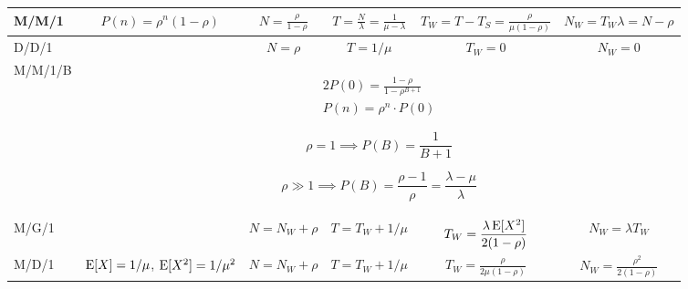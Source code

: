 \documentclass{form}
\begin{document}
\begin{center}
    \begin{tabular}{@{}l || c | c | c | c | c @{}}
        M/M/1   & $\displaystyle P(n) = \rho^n(1-\rho)$   & $\displaystyle N=\frac{\rho}{1-\rho}$ & $\displaystyle T=\frac{N}{\lambda} = \frac{1}{\mu-\lambda}$ & $\displaystyle T_W = T-T_S = \frac{\rho}{\mu(1-\rho)}$ & $\displaystyle N_W = T_W \lambda = N-\rho$ \\ \hline
        D/D/1   &                                         & $\displaystyle N=\rho$                & $\displaystyle T=1/\mu$                                     & $\displaystyle T_W = 0$                                & $\displaystyle N_W = 0$                    \\ \hline
        M/M/1/B & \multicolumn{5}{c}{
            \begin{minipage}{0.15\textwidth}
                \vspace{-0.8em}
                \begin{alignat*}{2}
                    P(0) = \frac{1-\rho}{1-\rho^{B+1}} \\
                    P(n) = \rho^n\cdot P(0)
                \end{alignat*}
            \end{minipage}
            \begin{minipage}{0.35\textwidth}
                \vspace{-0.8em}
                \begin{equation*}
                    \rho = 1 \implies P(B) = \frac{1}{B+1}
                \end{equation*}
            \end{minipage}
            \begin{minipage}{0.30\textwidth}
                \vspace{-0.8em}
                \begin{equation*}
                    \rho \gg 1 \implies P(B) = \frac{\rho-1}{\rho} = \frac{\lambda - \mu}{\lambda}
                \end{equation*}
            \end{minipage}
        } \\ \hline
        M/G/1   &                                         & $\displaystyle N=N_W + \rho$                & $\displaystyle T=T_W+1/\mu$                             & $\displaystyle T_W = \frac{\lambda \operatorname{E}[X^2]}{2(1-\rho)}$                    & $\displaystyle N_W = \lambda T_W$                 \\ \hline
        M/D/1   & $\operatorname{E}[X]=1/\mu$, $\operatorname{E}[X^2]=1/\mu^2$ & $\displaystyle N=N_W + \rho$                & $\displaystyle T=T_W+1/\mu$                             & $\displaystyle T_W = \frac{\rho}{2 \mu (1-\rho)}$                    & $\displaystyle N_W = \frac{\rho^2}{2 (1-\rho)}$                 \\
    \end{tabular}
\end{center}
\end{document}
